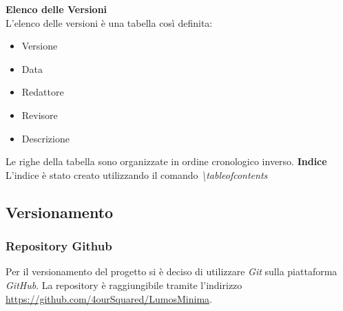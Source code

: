 \documentclass[a4paper, 12pt]{article}
\begin{document}
\textbf{Elenco delle Versioni} \\
L'elenco delle versioni è una tabella così definita:
\begin{itemize}
    \item Versione
    \item Data
    \item Redattore
    \item Revisore
    \item Descrizione
\end{itemize}
Le righe della tabella sono organizzate in ordine cronologico inverso. 
\newline \newline
\textbf{Indice} \\
L'indice è stato creato utilizzando il comando \textit{\textbackslash tableofcontents}

\subsection{Versionamento}
\subsubsection{Repository Github}
Per il versionamento del progetto si è deciso di utilizzare \textit{Git} sulla piattaforma \textit{GitHub}. La repository è raggiungibile tramite l'indirizzo \href{https://github.com/4ourSquared/LumosMinima}{https://github.com/4ourSquared/LumosMinima}.
\end{document}
